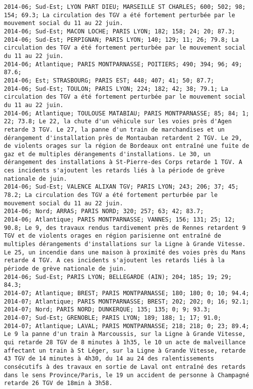 \documentclass{article}
\begin{document}
\begin{Verbatim}[commandchars=\\\{\}]
2014-06; Sud-Est; LYON PART DIEU; MARSEILLE ST CHARLES; 600; 502; 98; 154; 69.3; La circulation des TGV a été fortement perturbée par le mouvement social du 11 au 22 juin.
2014-06; Sud-Est; MACON LOCHE; PARIS LYON; 182; 158; 24; 20; 87.3; 
2014-06; Sud-Est; PERPIGNAN; PARIS LYON; 140; 129; 11; 26; 79.8; La circulation des TGV a été fortement perturbée par le mouvement social du 11 au 22 juin.
2014-06; Atlantique; PARIS MONTPARNASSE; POITIERS; 490; 394; 96; 49; 87.6; 
2014-06; Est; STRASBOURG; PARIS EST; 448; 407; 41; 50; 87.7; 
2014-06; Sud-Est; TOULON; PARIS LYON; 224; 182; 42; 38; 79.1; La circulation des TGV a été fortement perturbée par le mouvement social du 11 au 22 juin.
2014-06; Atlantique; TOULOUSE MATABIAU; PARIS MONTPARNASSE; 85; 84; 1; 22; 73.8; Le 22, la chute d'un véhicule sur les voies près d'Agen retarde 3 TGV. Le 27, la panne d'un train de marchandises et un dérangement d'installation près de Montauban retardent 2 TGV. Le 29, de violents orages sur la région de Bordeaux ont entraîné une fuite de gaz et de multiples dérangements d'installations. Le 30, un dérangement des installations à St-Pierre-des Corps retarde 1 TGV. A ces incidents s'ajoutent les retards liés à la période de grève nationale de juin.
2014-06; Sud-Est; VALENCE ALIXAN TGV; PARIS LYON; 243; 206; 37; 45; 78.2; La circulation des TGV a été fortement perturbée par le mouvement social du 11 au 22 juin.
2014-06; Nord; ARRAS; PARIS NORD; 320; 257; 63; 42; 83.7; 
2014-06; Atlantique; PARIS MONTPARNASSE; VANNES; 156; 131; 25; 12; 90.8; Le 9, des travaux rendus tardivement près de Rennes retardent 9 TGV et de violents orages en région parisienne ont entraîné de multiples dérangements d'installations sur la Ligne à Grande Vitesse. Le 25, un incendie dans une maison à proximité des voies près du Mans retarde 4 TGV. A ces incidents s'ajoutent les retards liés à la période de grève nationale de juin.
2014-06; Sud-Est; PARIS LYON; BELLEGARDE (AIN); 204; 185; 19; 29; 84.3; 
2014-07; Atlantique; BREST; PARIS MONTPARNASSE; 180; 180; 0; 10; 94.4; 
2014-07; Atlantique; PARIS MONTPARNASSE; BREST; 202; 202; 0; 16; 92.1; 
2014-07; Nord; PARIS NORD; DUNKERQUE; 135; 135; 0; 9; 93.3; 
2014-07; Sud-Est; GRENOBLE; PARIS LYON; 189; 188; 1; 17; 91.0; 
2014-07; Atlantique; LAVAL; PARIS MONTPARNASSE; 218; 218; 0; 23; 89.4; Le 9 la panne d'un train à Marcoussis, sur la Ligne à Grande Vitesse, qui retarde 28 TGV de 8 minutes à 1h35, le 10 un acte de malveillance affectant un train à St Léger, sur la Ligne à Grande Vitesse, retarde 43 TGV de 14 minutes à 4h30, du 14 au 24 des ralentissements consécutifs à des travaux en sortie de Laval ont entraîné des retards dans le sens Province/Paris, le 19 un accident de personne à Champagné retarde 26 TGV de 18min à 3h58.


\end{Verbatim}
\end{document}
